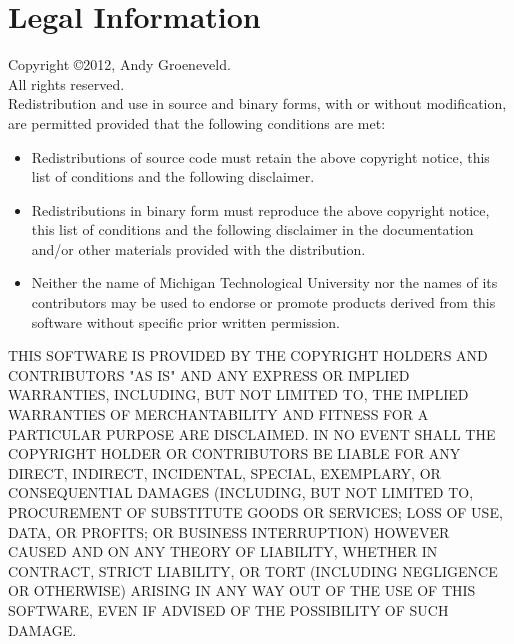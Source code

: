 \documentclass[letterpaper]{article}
\begin{document}
\section{Legal Information}
Copyright \copyright 2012, Andy Groeneveld. \\
All rights reserved. \\

Redistribution and use in source and binary forms, with or without modification, are permitted provided that the following conditions are met:

\begin{itemize}
\item Redistributions of source code must retain the above copyright notice, this list of conditions and the following disclaimer.
\item Redistributions in binary form must reproduce the above copyright notice, this list of conditions and the following disclaimer in the documentation and/or other materials provided with the distribution.
\item Neither the name of Michigan Technological University nor the names of its contributors may be used to endorse or promote products derived from this software without specific prior written permission.
\end{itemize}

THIS SOFTWARE IS PROVIDED BY THE COPYRIGHT HOLDERS AND CONTRIBUTORS "AS IS" AND ANY EXPRESS OR IMPLIED WARRANTIES, INCLUDING, BUT NOT LIMITED TO, THE IMPLIED WARRANTIES OF MERCHANTABILITY AND FITNESS FOR A PARTICULAR PURPOSE ARE DISCLAIMED. IN NO EVENT SHALL THE COPYRIGHT HOLDER OR CONTRIBUTORS BE LIABLE FOR ANY DIRECT, INDIRECT, INCIDENTAL, SPECIAL, EXEMPLARY, OR CONSEQUENTIAL DAMAGES (INCLUDING, BUT NOT LIMITED TO, PROCUREMENT OF SUBSTITUTE GOODS OR SERVICES; LOSS OF USE, DATA, OR PROFITS; OR BUSINESS INTERRUPTION) HOWEVER CAUSED AND ON ANY THEORY OF LIABILITY, WHETHER IN CONTRACT, STRICT LIABILITY, OR TORT (INCLUDING NEGLIGENCE OR OTHERWISE) ARISING IN ANY WAY OUT OF THE USE OF THIS SOFTWARE, EVEN IF ADVISED OF THE POSSIBILITY OF SUCH DAMAGE.
\end{document}
